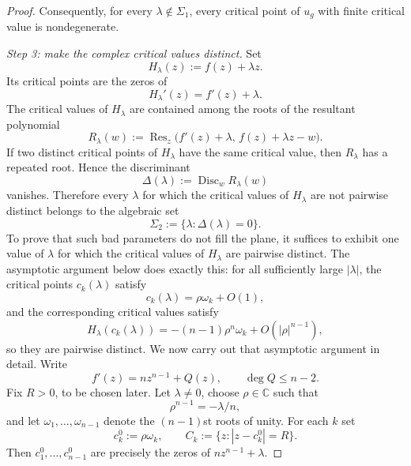 \documentclass[12pt]{amsart}
\theoremstyle{definition}
\theoremstyle{remark}
\begin{document}
\begin{proof}
Consequently, for every $\lambda\notin\Sigma_1$, every critical point of $u_g$ with finite critical value is nondegenerate.



\noindent\textit{Step 3: make the complex critical values distinct.} Set
\[
H_\lambda(z):=f(z)+\lambda z.
\]
Its critical points are the zeros of
\[
H_\lambda'(z)=f'(z)+\lambda.
\]
The critical values of $H_\lambda$ are contained among the roots of the resultant polynomial
\[
R_\lambda(w):=\operatorname{Res}_z\bigl(f'(z)+\lambda,\,f(z)+\lambda z-w\bigr).
\]
If two distinct critical points of $H_\lambda$ have the same critical value, then
$R_\lambda$ has a repeated root. Hence the discriminant
\[
\Delta(\lambda):=\operatorname{Disc}_w R_\lambda(w)
\]
vanishes. Therefore every $\lambda$ for which the critical values of $H_\lambda$ are not
pairwise distinct belongs to the algebraic set
\[
\Sigma_2:=\{\lambda:\Delta(\lambda)=0\}.
\]
To prove that such bad parameters do not fill the plane, it suffices to exhibit one value of
$\lambda$ for which the critical values of $H_\lambda$ are pairwise distinct. The asymptotic
argument below does exactly this: for all sufficiently large $|\lambda|$, the critical points $c_k(\lambda)$
satisfy
\[
c_k(\lambda)=\rho\omega_k+O(1),
\]
and the corresponding critical values satisfy
\[
H_\lambda(c_k(\lambda))=-(n-1)\rho^n\omega_k+O(|\rho|^{n-1}),
\]
so they are pairwise distinct. We now carry out that asymptotic argument in detail.
Write
\[
 f'(z)=nz^{n-1}+Q(z),\qquad \deg Q\le n-2.
\]
Fix $R>0$, to be chosen later. Let $\lambda\neq 0$, choose $\rho\in\mathbb{C}$ such that
\[
 \rho^{n-1}=-\lambda/n,
\]
and let $\omega_1,\dots,\omega_{n-1}$ denote the $(n-1)$st roots of unity. For each $k$ set
\[
 c_k^0:=\rho\omega_k,\qquad C_k:=\{z:|z-c_k^0|=R\}.
\]
Then $c_1^0,\dots,c_{n-1}^0$ are precisely the zeros of $nz^{n-1}+\lambda$.


\end{proof}
\end{document}
